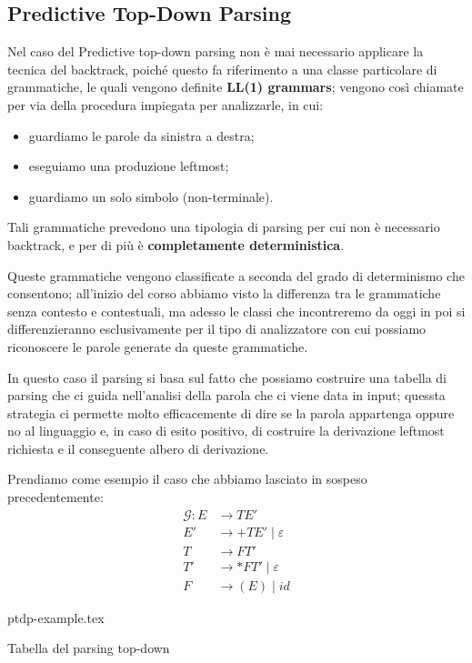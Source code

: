\documentclass[class=book, crop=false, oneside, 12pt]{standalone}
\begin{document}
\subsection{Predictive Top-Down Parsing}
Nel caso del Predictive top-down parsing non è mai necessario applicare la tecnica del backtrack, poiché questo fa riferimento a una classe particolare di grammatiche, le quali vengono definite \textbf{LL(1) grammars}; vengono così chiamate per via della procedura impiegata per analizzarle, in cui:
\begin{itemize}
    \item guardiamo le parole da sinistra a destra;
    \item eseguiamo una produzione leftmost;
    \item guardiamo un solo simbolo (non-terminale).
\end{itemize}
Tali grammatiche prevedono una tipologia di parsing per cui non è necessario backtrack, e per di più è \textbf{completamente deterministica}.

Queste grammatiche vengono classificate a seconda del grado di determinismo che consentono; all'inizio del corso abbiamo visto la differenza tra le grammatiche senza contesto e contestuali, ma adesso le classi che incontreremo da oggi in poi si differenzieranno esclusivamente per il tipo di analizzatore con cui possiamo riconoscere le parole generate da queste grammatiche. 

In questo caso il parsing si basa sul fatto che possiamo costruire una tabella di parsing che ci guida nell'analisi della parola che ci viene data in input; quessta strategia ci permette molto efficacemente di dire se la parola appartenga oppure no al linguaggio e, in caso di esito positivo, di costruire la derivazione leftmost richiesta e il conseguente albero di derivazione.

Prendiamo come esempio il caso che abbiamo lasciato in sospeso precedentemente:
\begin{align*}
    \mathcal{G}: E &\rightarrow TE' \\
    E' &\rightarrow +TE' \mid \varepsilon \\
    T &\rightarrow FT' \\
    T' &\rightarrow *FT' \mid \varepsilon \\
    F &\rightarrow (E) \mid id
\end{align*}
\begin{table}[H]
	\centering
	{ptdp-example.tex}
    \caption{Tabella del parsing top-down}
    \label{ptdp-example}
\end{table} 
\end{document}
